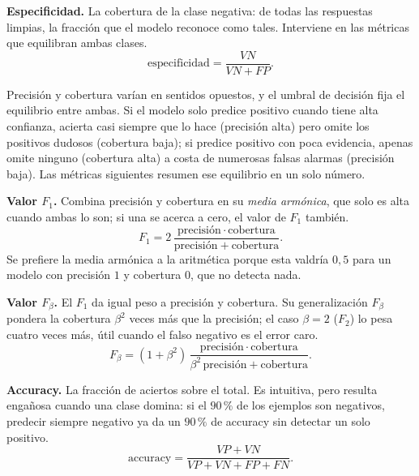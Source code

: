 \documentclass[12pt,a4paper]{report}
\theoremstyle{definition}
\begin{document}
\medskip
\noindent\textbf{Especificidad.} La cobertura de la clase negativa: de todas las respuestas limpias, la
fracción que el modelo reconoce como tales. Interviene en las métricas que equilibran ambas clases.
\begin{equation}
\mathrm{especificidad} = \frac{VN}{VN+FP}.
\label{eq:especificidad}
\end{equation}

\medskip
Precisión y cobertura varían en sentidos opuestos, y el umbral de decisión fija el equilibrio entre
ambas. Si el modelo solo predice positivo cuando tiene alta confianza, acierta casi siempre que lo hace
(precisión alta) pero omite los positivos dudosos (cobertura baja); si predice positivo con poca
evidencia, apenas omite ninguno (cobertura alta) a costa de numerosas falsas alarmas (precisión baja).
Las métricas siguientes resumen ese equilibrio en un solo número.

\medskip
\noindent\textbf{Valor $F_1$.} Combina precisión y cobertura en su \emph{media armónica}, que solo es alta
cuando ambas lo son; si una se acerca a cero, el valor de $F_1$ también.
\begin{equation}
F_1 = 2\,\frac{\mathrm{precisión}\cdot\mathrm{cobertura}}{\mathrm{precisión}+\mathrm{cobertura}}.
\label{eq:f1}
\end{equation}
Se prefiere la media armónica a la aritmética porque esta valdría $0{,}5$ para un modelo con precisión
$1$ y cobertura $0$, que no detecta nada.

\medskip
\noindent\textbf{Valor $F_\beta$.} El $F_1$ da igual peso a precisión y cobertura. Su generalización $F_\beta$ pondera la cobertura $\beta^2$ veces más que la precisión; el caso
$\beta=2$ ($F_2$) lo pesa cuatro veces más, útil cuando el falso negativo es el error caro.
\begin{equation}
F_\beta = (1+\beta^2)\,\frac{\mathrm{precisión}\cdot\mathrm{cobertura}}
{\beta^2\,\mathrm{precisión}+\mathrm{cobertura}}.
\label{eq:fbeta}
\end{equation}

\medskip
\noindent\textbf{Accuracy.} La fracción de aciertos sobre el total. Es intuitiva, pero resulta engañosa
cuando una clase domina: si el $90\,\%$ de los ejemplos son negativos, predecir siempre negativo ya da
un $90\,\%$ de accuracy sin detectar un solo positivo.
\begin{equation}
\mathrm{accuracy} = \frac{VP+VN}{VP+VN+FP+FN}.
\label{eq:accuracy}
\end{equation}
\end{document}
